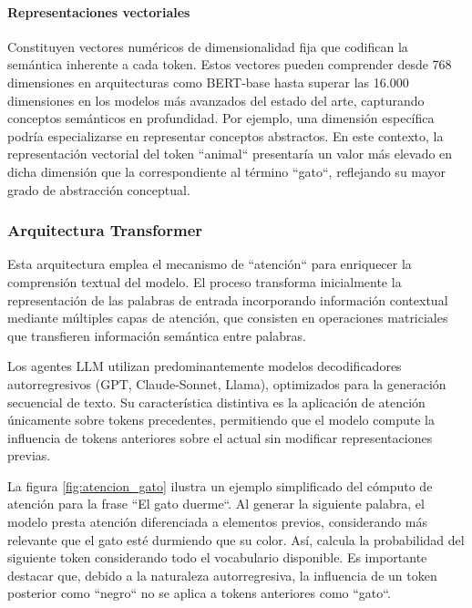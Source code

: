 \paragraph{Representaciones vectoriales}
Constituyen vectores numéricos de dimensionalidad fija que codifican la semántica inherente a cada token. Estos vectores pueden comprender desde 768 dimensiones en arquitecturas como BERT-base hasta superar las 16.000 dimensiones en los modelos más avanzados del estado del arte, capturando conceptos semánticos en profundidad. Por ejemplo, una dimensión específica podría especializarse en representar conceptos abstractos. En este contexto, la representación vectorial del token ``animal`` presentaría un valor más elevado en dicha dimensión que la correspondiente al término ``gato``, reflejando su mayor grado de abstracción conceptual.

\subsubsection{Arquitectura Transformer}
Esta arquitectura emplea el mecanismo de ``atención`` para enriquecer la comprensión textual del modelo. El proceso transforma inicialmente la representación de las palabras de entrada incorporando información contextual mediante múltiples capas de atención, que consisten en operaciones matriciales que transfieren información semántica entre palabras. 

Los agentes LLM utilizan predominantemente modelos decodificadores autorregresivos (GPT, Claude-Sonnet, Llama), optimizados para la generación secuencial de texto. Su característica distintiva es la aplicación de atención únicamente sobre tokens precedentes, permitiendo que el modelo compute la influencia de tokens anteriores sobre el actual sin modificar representaciones previas.

La figura \ref{fig:atencion_gato} ilustra un ejemplo simplificado del cómputo de atención para la frase ``El gato duerme``. Al generar la siguiente palabra, el modelo presta atención diferenciada a elementos previos, considerando más relevante que el gato esté durmiendo que su color. Así, calcula la probabilidad del siguiente token considerando todo el vocabulario disponible. Es importante destacar que, debido a la naturaleza autorregresiva, la influencia de un token posterior como ``negro`` no se aplica a tokens anteriores como ``gato``.

